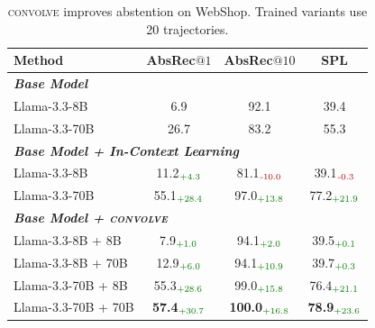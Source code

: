 \documentclass{article}
\newcommand{\method}{\textsc{convolve}\xspace}
\begin{document}
\begin{table}
\vspace{-1.3em}
\centering
\footnotesize
\caption{\method improves abstention on WebShop. Trained variants use 20 trajectories.}
\vspace{-0.5em}
\label{tab:context_evolving}
\setlength\tabcolsep{2.0pt}
\fontsize{7.8pt}{9.2pt}\selectfont
\begin{tabular}{p{2.5cm}ccc}
\toprule
\textbf{Method} & AbsRec$@1$ & AbsRec$@10$ & SPL \\
\midrule
\multicolumn{4}{l}{\textit{\textbf{Base Model}}} \\
Llama-3.3-8B         & 6.9 & 92.1 & 39.4  \\
Llama-3.3-70B        & 26.7 & 83.2 & 55.3  \\
\midrule
\multicolumn{4}{l}{\textit{\textbf{Base Model + In-Context Learning}}} \\
Llama-3.3-8B         & 11.2$_{\text{\textcolor{scoregreen}{+4.3}}}$  & 81.1$_{\text{\textcolor{scorered}{-10.0}}}$ & 39.1$_{\text{\textcolor{scorered}{-0.3}}}$  \\
Llama-3.3-70B        & 55.1$_{\text{\textcolor{scoregreen}{+28.4}}}$ & 97.0$_{\text{\textcolor{scoregreen}{+13.8}}}$ & 77.2$_{\text{\textcolor{scoregreen}{+21.9}}}$ \\
\midrule
\multicolumn{4}{l}{\textit{\textbf{Base Model + \method}}} \\
Llama-3.3-8B + 8B    & 7.9$_{\text{\textcolor{scoregreen}{+1.0}}}$ & 94.1$_{\text{\textcolor{scoregreen}{+2.0}}}$ & 39.5$_{\text{\textcolor{scoregreen}{+0.1}}}$  \\
Llama-3.3-8B + 70B   & 12.9$_{\text{\textcolor{scoregreen}{+6.0}}}$ & 94.1$_{\text{\textcolor{scoregreen}{+10.9}}}$ & 39.7$_{\text{\textcolor{scoregreen}{+0.3}}}$ \\
\rowcolor[RGB]{236,244,252}
Llama-3.3-70B + 8B   & 55.3$_{\text{\textcolor{scoregreen}{+28.6}}}$ & 99.0$_{\text{\textcolor{scoregreen}{+15.8}}}$ & 76.4$_{\text{\textcolor{scoregreen}{+21.1}}}$ \\
\rowcolor[RGB]{236,244,252}
Llama-3.3-70B + 70B  & \textbf{57.4}$_{\text{\textcolor{scoregreen}{+30.7}}}$ & \textbf{100.0}$_{\text{\textcolor{scoregreen}{+16.8}}}$ & \textbf{78.9}$_{\text{\textcolor{scoregreen}{+23.6}}}$ \\
\bottomrule
\end{tabular}
\vspace{-4em}
\end{table}
\end{document}
